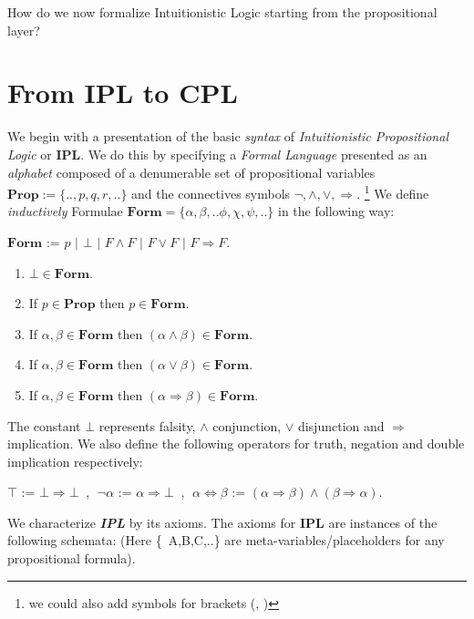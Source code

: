 	
	How do we now formalize Intuitionistic Logic starting from the propositional layer?

	\newpage

	\section{From \textbf{IPL} to \textbf{CPL}}
	
	We begin with a presentation of the basic \emph{syntax} of \emph{Intuitionistic Propositional Logic} or \textbf{IPL}. \newline
	We do this by specifying a \emph{Formal Language} presented as an \emph{alphabet} composed of a denumerable set of propositional variables $\textbf{Prop}:=\{..,p,q,r,..\}$ and the connectives symbols $\neg, \land, \lor, \Rightarrow$. \footnote{we could also add symbols for brackets (, ) } 
	\newline
	We define \emph{inductively} Formulae $\mathbf{Form} = \{\alpha,\beta,..\phi,\chi,\psi,..\}$ in the following way:
	\begin{definition}
		$\mathbf{Form}$ := $p$ $|$ $\bot$ $|$ $ F \land F $ $|$ $ F \lor F $ $|$ $ F \Rightarrow F $.
		\begin{enumerate}[label=\roman*]
			\item $\bot \in \mathbf{Form}$.
			\item  If $p\in \mathbf{Prop}$ then $p \in \mathbf{Form}$.
			\item  If $\alpha, \beta \in \mathbf{Form}$ then $(\alpha \land \beta) \in \mathbf{Form}$.
			\item  If $\alpha, \beta \in \mathbf{Form}$ then $(\alpha \lor \beta) \in \mathbf{Form}$.
			\item  If $\alpha, \beta \in \mathbf{Form}$ then $(\alpha \Rightarrow \beta) \in \mathbf{Form}$.
		\end{enumerate}
	\end{definition} 
	The constant $\bot$ represents falsity, $\land$ conjunction, $\lor$ disjunction and $\Rightarrow$ implication.
	We also define the following operators for truth, negation and double implication respectively:
	\begin{definition}
		$\top$ := $\bot \Rightarrow \bot  \;\;$,	$\; \neg \alpha$ := $\alpha \Rightarrow \bot \;\;$,	$\; \alpha \Leftrightarrow \beta$ := $(\alpha \Rightarrow \beta) \land (\beta \Rightarrow \alpha)$.
	\end{definition}

	We characterize \emph{\textbf{IPL}} by its axioms. \newline
	 The axioms for \textbf{IPL} are instances of the following schemata: \newline (Here \{\ A,B,C,..\} are meta-variables/placeholders for any propositional formula).
	
